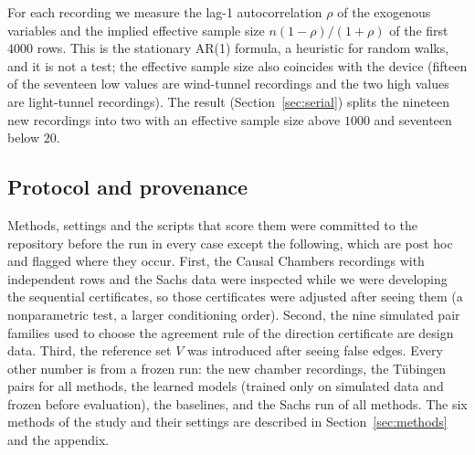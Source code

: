 For each recording we measure the lag-1 autocorrelation $\rho$ of the exogenous
variables and the implied effective sample size $n(1-\rho)/(1+\rho)$ of the first $4000$ rows. This
is the stationary AR(1) formula, a heuristic for random walks, and it is not a test; the effective sample
size also coincides with the device (fifteen of the seventeen low values are wind-tunnel recordings and the
two high values are light-tunnel recordings).
The result (Section~\ref{sec:serial}) splits the nineteen new recordings into two with an
effective sample size above $1000$ and seventeen below $20$.

\subsection{Protocol and provenance}\label{sec:provenance}

Methods, settings and the scripts that score them were committed to the repository
before the run in every case except the following, which are post hoc and flagged where they
occur. First, the Causal Chambers recordings with independent rows and the Sachs data were
inspected while we were developing the sequential certificates, so those certificates
were adjusted after seeing them (a nonparametric test, a larger conditioning order). Second,
the nine simulated pair families used to choose the agreement rule of the direction
certificate are design data. Third, the reference set $V$ was introduced after seeing
false edges. Every other number is from a frozen run: the new chamber recordings, the
Tübingen pairs for all methods, the learned models (trained only on simulated data and
frozen before evaluation), the baselines, and the Sachs run of all methods. The six
methods of the study and their settings are described in Section~\ref{sec:methods} and the
appendix.
